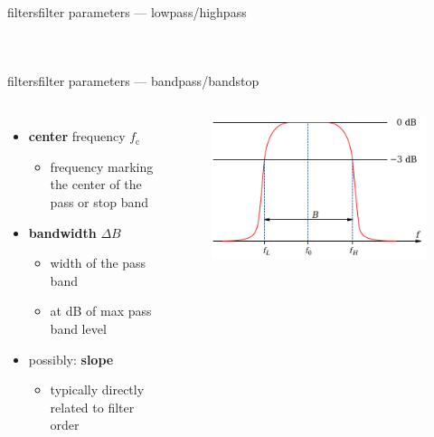 \begin{frame}{filters}{filter parameters --- lowpass/highpass}
\begin{columns}
\begin{figure}
                \end{figure}
            \end{columns}
        \end{frame}
        \begin{frame}{filters}{filter parameters --- bandpass/bandstop}
            \begin{columns}
                \begin{itemize}
                    \item   \textbf{center} frequency $f_\mathrm{c}$
                        \begin{itemize}
                            \item   frequency marking the center of the pass or stop band
                        \end{itemize}
                    \smallskip
                    \item   \textbf{bandwidth} $\Delta B$
                        \begin{itemize}
                            \item   width of the pass band
                            \item   at \unit[-3]{dB} of max pass band level
                        \end{itemize}
                    \smallskip
                    \item   possibly: \textbf{slope}    
                        \begin{itemize}
                            \item   typically directly related to filter order
                        \end{itemize}
                \end{itemize}
                \begin{figure}%
                    \includegraphics[width=.9\columnwidth]{graph/filter_parameters_bandpass}%
                \end{figure}
            \end{columns}
        \end{frame}
